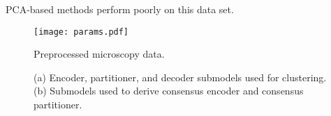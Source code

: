 PCA-based methods perform poorly on this data set.


\begin{figure}
  \texttt{[image: params.pdf]}
    \caption{Preprocessed microscopy data. }
    \label{fig:params}
\end{figure}

\begin{figure}
     \begin{subfigure}[b]{0.5\textwidth}
        
         \caption{}
         \label{fig:}
     \end{subfigure}
     \hfill
     \begin{subfigure}[b]{\textwidth}
        
        \caption{}
        \label{fig:}
     \end{subfigure}

     \caption{
       (a) Encoder, partitioner, and decoder submodels used for clustering.
       (b) Submodels used to derive consensus encoder and consensus partitioner.
     }
\end{figure}

